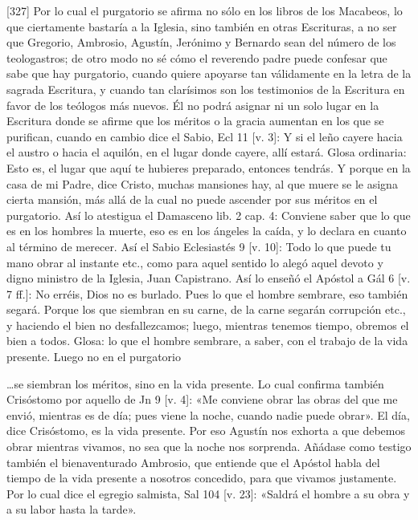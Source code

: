 [327] Por lo cual el purgatorio se afirma no sólo en los libros de los Macabeos, lo que ciertamente bastaría a la Iglesia, sino también en otras Escrituras, a no ser que Gregorio, Ambrosio, Agustín, Jerónimo y Bernardo sean del número de los teologastros; de otro modo no sé cómo el reverendo padre puede confesar que sabe que hay purgatorio, cuando quiere apoyarse tan válidamente en la letra de la sagrada Escritura, y cuando tan clarísimos son los testimonios de la Escritura en favor de los teólogos más nuevos. Él no podrá asignar ni un solo lugar en la Escritura donde se afirme que los méritos o la gracia aumentan en los que se purifican, cuando en cambio dice el Sabio, Ecl 11 [v. 3]: Y si el leño cayere hacia el austro o hacia el aquilón, en el lugar donde cayere, allí estará. Glosa ordinaria: Esto es, el lugar que aquí te hubieres preparado, entonces tendrás. Y porque en la casa de mi Padre, dice Cristo, muchas mansiones hay, al que muere se le asigna cierta mansión, más allá de la cual no puede ascender por sus méritos en el purgatorio. Así lo atestigua el Damasceno lib. 2 cap. 4: Conviene saber que lo que es en los hombres la muerte, eso es en los ángeles la caída, y lo declara en cuanto al término de merecer. Así el Sabio Eclesiastés 9 [v. 10]: Todo lo que puede tu mano obrar al instante etc., como para aquel sentido lo alegó aquel devoto y digno ministro de la Iglesia, Juan Capistrano. Así lo enseñó el Apóstol a Gál 6 [v. 7 ff.]: No erréis, Dios no es burlado. Pues lo que el hombre sembrare, eso también segará. Porque los que siembran en su carne, de la carne segarán corrupción etc., y haciendo el bien no desfallezcamos; luego, mientras tenemos tiempo, obremos el bien a todos. Glosa: lo que el hombre sembrare, a saber, con el trabajo de la vida presente. Luego no en el purgatorio

…se siembran los méritos, sino en la vida presente. Lo cual confirma también Crisóstomo por aquello de Jn 9 [v. 4]: «Me conviene obrar las obras del que me envió, mientras es de día; pues viene la noche, cuando nadie puede obrar». El día, dice Crisóstomo, es la vida presente. Por eso Agustín nos exhorta a que debemos obrar mientras vivamos, no sea que la noche nos sorprenda. Añádase como testigo también el bienaventurado Ambrosio, que entiende que el Apóstol habla del tiempo de la vida presente a nosotros concedido, para que vivamos justamente. Por lo cual dice el egregio salmista, Sal 104 [v. 23]: «Saldrá el hombre a su obra y a su labor hasta la tarde».

